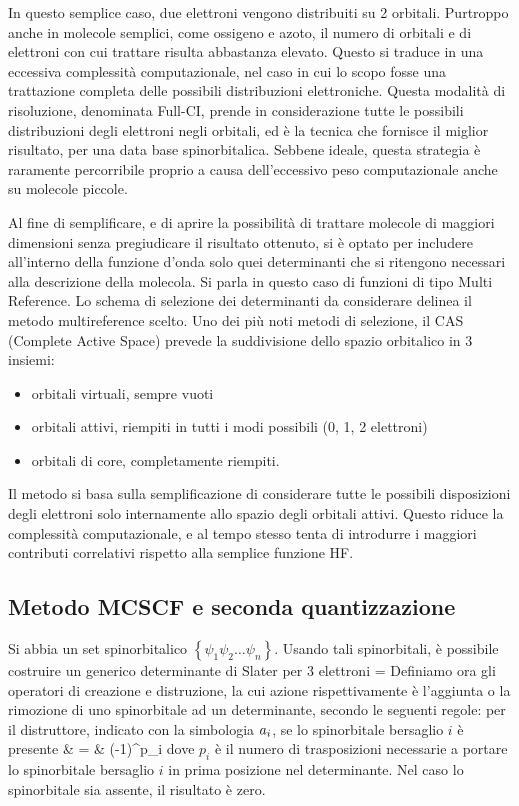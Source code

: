 In questo semplice caso, due elettroni vengono distribuiti
su 2 orbitali. Purtroppo anche in molecole semplici, come ossigeno e
azoto, il numero di orbitali e di elettroni con cui trattare risulta
abbastanza elevato. Questo si traduce in una eccessiva complessit\`a computazionale,
nel caso in cui lo scopo fosse una trattazione completa delle possibili distribuzioni
elettroniche. Questa modalit\`a di risoluzione, denominata Full-CI, prende in
considerazione tutte le possibili distribuzioni degli elettroni negli orbitali,
ed \`e la tecnica che fornisce il miglior risultato, per una data
base spinorbitalica. Sebbene ideale, questa strategia \`e raramente 
percorribile proprio a causa dell'eccessivo peso computazionale anche su molecole
piccole.

Al fine di semplificare, e di aprire la possibilit\`a di trattare molecole
di maggiori dimensioni senza pregiudicare il risultato ottenuto, si \`e
optato per includere all'interno della funzione d'onda solo quei determinanti
che si ritengono necessari alla descrizione della molecola. Si parla in questo caso di funzioni
di tipo Multi Reference. Lo schema di selezione dei determinanti da considerare
delinea il metodo multireference scelto.
Uno dei pi\`u noti metodi di selezione, il CAS (Complete Active Space) prevede la
suddivisione dello spazio orbitalico in 3 insiemi: 
\begin{itemize}
\item orbitali virtuali, sempre vuoti
\item orbitali attivi, riempiti in tutti i modi possibili (0, 1, 2
elettroni)
\item orbitali di core, completamente riempiti.
\end{itemize}

Il metodo si basa sulla semplificazione di considerare tutte le possibili
disposizioni degli elettroni solo internamente allo spazio degli
orbitali attivi. Questo riduce la complessit\`a computazionale, e al
tempo stesso tenta di introdurre i maggiori contributi correlativi rispetto
alla semplice funzione HF.

\subsection{Metodo MCSCF e seconda quantizzazione}

Si abbia un set spinorbitalico $ \left\{ \psi_1 \psi_2
\ldots \psi_{n} \right\}$. Usando tali spinorbitali, \`e possibile costruire
un generico determinante di Slater per 3 elettroni
\beq
\Phi = 
\eeq
Definiamo ora gli operatori di creazione e distruzione, la cui azione
rispettivamente \`e l'aggiunta o la rimozione di uno spinorbitale ad un
determinante, secondo le seguenti regole: per il distruttore, indicato con
la simbologia $a_{i}$, se lo spinorbitale bersaglio $i$ \`e presente
\beqas
{}
 & = &
(-1)^{p_i} 
\eeqas
dove $p_i$ \`e il numero di trasposizioni necessarie a portare lo spinorbitale
bersaglio $i$ in prima posizione nel determinante.
Nel caso lo spinorbitale sia assente, il risultato \`e zero.

